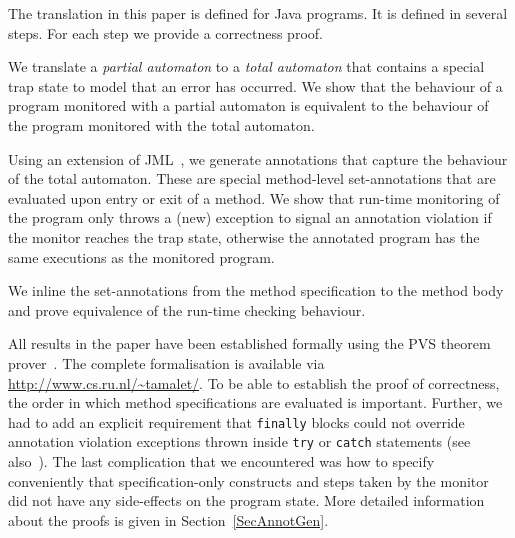 The translation in this paper is defined for Java programs. It is
defined in several steps. For each step we provide a correctness
proof.
\begin{inparaenum}
\item We translate a \emph{partial automaton} to a \emph{total automaton}
that contains a special trap state to model that an error has
occurred.
We show that the behaviour of a program monitored with a partial
automaton is equivalent to the behaviour of the program monitored with
the total automaton.
\item Using an extension of JML~\cite{LeavensPCCRCK05}, we generate annotations
that capture the behaviour of the total automaton. These are special
method-level set-annotations that are evaluated upon entry or exit of
a method.  We show that run-time monitoring of the program only throws
a (new) exception to signal an annotation violation if the monitor
reaches the trap state, otherwise the annotated program has the same
executions as the monitored program.
\item We inline the set-annotations from the method specification
to the method body and prove equivalence of the run-time checking behaviour.
\end{inparaenum}
All results in the paper have been established formally using
the PVS theorem prover~\cite{OwreRRSS96}. The complete formalisation
is available via \url{http://www.cs.ru.nl/~tamalet/}. To be able to
establish the proof of correctness, the order in which method
specifications are evaluated is important. Further, we had to add an
explicit requirement that \texttt{finally} blocks could not override
annotation violation exceptions thrown inside \texttt{try} or
\texttt{catch} statements (see also~\cite{Huisman08}). The last
complication that we encountered was how to specify conveniently that
specification-only constructs and steps taken by the monitor did not
have any side-effects on the program state. More detailed information
about the proofs is given in Section~\ref{SecAnnotGen}.

